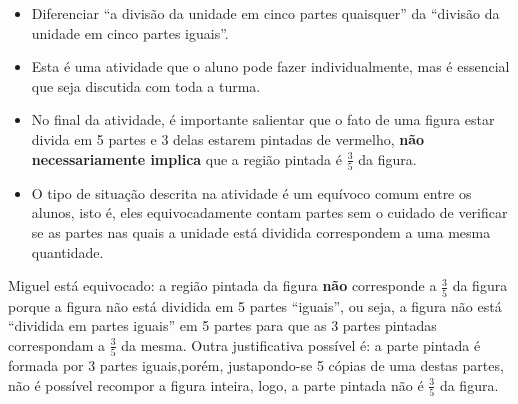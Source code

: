 \clearpage

\begin{atividade}\label{chap2-ativ16}
\objetivos
  \begin{itemize} %
    \item Diferenciar ``a divisão da unidade em cinco partes quaisquer'' da ``divisão da unidade em cinco partes iguais''.
\end{itemize} %

\discussoes
\begin{itemize} %
    \item       Esta é uma atividade que o aluno pode fazer individualmente, mas é essencial que seja discutida com toda a turma.
    \item       No final da atividade, é importante salientar que o fato de  uma figura estar divida em 5 partes e 3 delas estarem pintadas de vermelho,       {\bfseries não necessariamente implica}       que a região pintada é       $\frac{3}{5}$ da figura.
    \item       O tipo de situação descrita na atividade é um equívoco comum entre os alunos, isto é, eles equivocadamente contam partes sem o cuidado de verificar se as partes nas quais a unidade está dividida correspondem a uma mesma quantidade.
\end{itemize} %

\solucao
Miguel está equivocado: a região pintada da figura   {\bfseries não}   corresponde a   $\frac{3}{5}$ da figura porque a figura não está dividida em 5 partes ``iguais'', ou seja, a figura não está ``dividida em partes iguais'' em 5 partes para que as 3 partes pintadas correspondam a   $\frac{3}{5}$ da mesma. Outra justificativa possível é: a parte pintada é formada por 3 partes iguais,porém,  justapondo-se 5 cópias de uma destas partes, não é possível recompor a figura inteira, logo, a parte pintada não é $\frac{3}{5}$ da figura.

\end{atividade}

